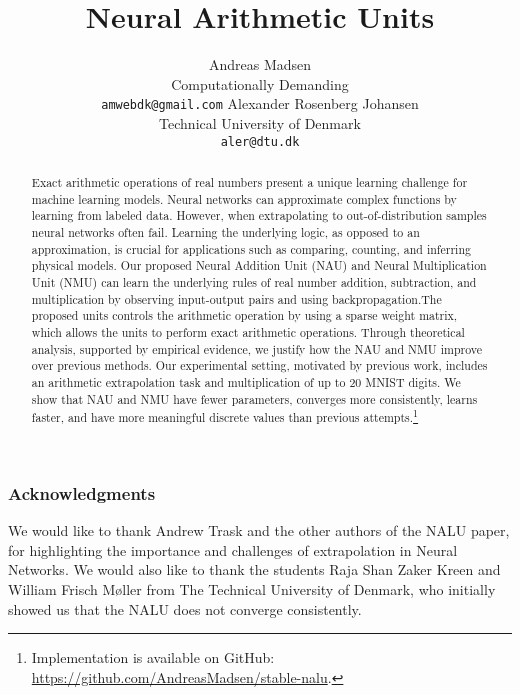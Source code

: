\documentclass{article}
\title{Neural Arithmetic Units}
\author{%
  Andreas Madsen \\
  Computationally Demanding \\
  \texttt{amwebdk@gmail.com}
  \And
  Alexander Rosenberg Johansen \\
  Technical University of Denmark \\
  \texttt{aler@dtu.dk} \\
}
\def\nonanonymous{}
\begin{document}
\maketitle

\begin{abstract}
Exact arithmetic operations of real numbers present a unique learning challenge for machine learning models. Neural networks can approximate complex functions by learning from labeled data. However, when extrapolating to out-of-distribution samples neural networks often fail. Learning the underlying logic, as opposed to an approximation, is crucial for applications such as comparing, counting, and inferring physical models. Our proposed Neural Addition Unit (NAU) and Neural Multiplication Unit (NMU) can learn the underlying rules of real number addition, subtraction, and multiplication by observing input-output pairs and using backpropagation.The proposed units controls the arithmetic operation by using a sparse weight matrix, which allows the units to perform exact arithmetic operations. Through theoretical analysis, supported by empirical evidence, we justify how the NAU and NMU improve over previous methods. Our experimental setting, motivated by previous work, includes an arithmetic extrapolation task and multiplication of up to 20 MNIST digits. We show that NAU and NMU have fewer parameters, converges more consistently, learns faster, and have more meaningful discrete values than previous attempts.\ifdefined\nonanonymous\footnote{Implementation is available on GitHub: \url{https://github.com/AndreasMadsen/stable-nalu}.}\fi
\end{abstract}







\clearpage
\ifdefined\nonanonymous
\subsubsection*{Acknowledgments}
We would like to thank Andrew Trask and the other authors of the NALU paper, for highlighting the importance and challenges of extrapolation in Neural Networks. We would also like to thank the students Raja Shan Zaker Kreen and William Frisch Møller from The Technical University of Denmark, who initially showed us that the NALU does not converge consistently.
\fi




\newpage
\appendix

\clearpage

\clearpage

\clearpage

\clearpage
\end{document}
